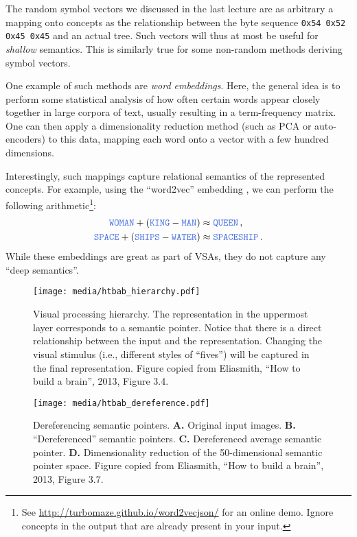 \documentclass[10pt,letterpaper,oneside]{article}
\newcommand{\Obj}[1]{\ensuremath{\mathtt{\textcolor{RoyalBlue}{#1}}}}
\begin{document}
The random symbol vectors we discussed in the last lecture are as arbitrary a mapping onto concepts as the relationship between the byte sequence \texttt{0x54 0x52 0x45 0x45} and an actual tree. Such vectors will thus at most be useful for \emph{shallow} semantics. This is similarly true for some non-random methods deriving symbol vectors.

One example of such methods are \emph{word embeddings}. Here, the general idea is to perform some statistical analysis of how often certain words appear closely together in large corpora of text, usually resulting in a term-frequency matrix. One can then apply a dimensionality reduction method (such as PCA or auto-encoders) to this data, mapping each word onto a vector with a few hundred dimensions.

Interestingly, such mappings capture relational semantics of the represented concepts. For example, using the \enquote{word2vec} embedding \cite{mikolov2013efficient}, we can perform the following arithmetic\footnote{See \url{http://turbomaze.github.io/word2vecjson/} for an online demo. Ignore concepts in the output that are already present in your input.}:
\begin{align*}
	\Obj{WOMAN} + (\Obj{KING} - \Obj{MAN}) &\approx \Obj{QUEEN} \,,\\
	\Obj{SPACE} + (\Obj{SHIPS} - \Obj{WATER}) &\approx \Obj{SPACESHIP} \,.
\end{align*}
While these embeddings are great as part of VSAs, they do not capture any \enquote{deep semantics}.

\begin{figure}[p]
	\centering
	\texttt{[image: media/htbab\_hierarchy.pdf]}
	\caption{Visual processing hierarchy. The representation in the uppermost layer corresponds to a semantic pointer. Notice that there is a direct relationship between the input and the representation. Changing the visual stimulus (i.e., different styles of \enquote{fives}) will be captured in the final representation. Figure copied from Eliasmith, \enquote{How to build a brain}, 2013, Figure 3.4.}
	\label{fig:htbab_hierarchy}
\end{figure}

\begin{figure}[p]
	\centering
	\texttt{[image: media/htbab\_dereference.pdf]}
	\caption{Dereferencing semantic pointers. \textbf{A.} Original input images. \textbf{B.} \enquote{Dereferenced} semantic pointers. \textbf{C.} Dereferenced average semantic pointer. \textbf{D.} Dimensionality reduction of the 50-dimensional semantic pointer space. Figure copied from Eliasmith, \enquote{How to build a brain}, 2013, Figure 3.7.}
	\label{fig:htbab_dereference}
\end{figure}
\end{document}

